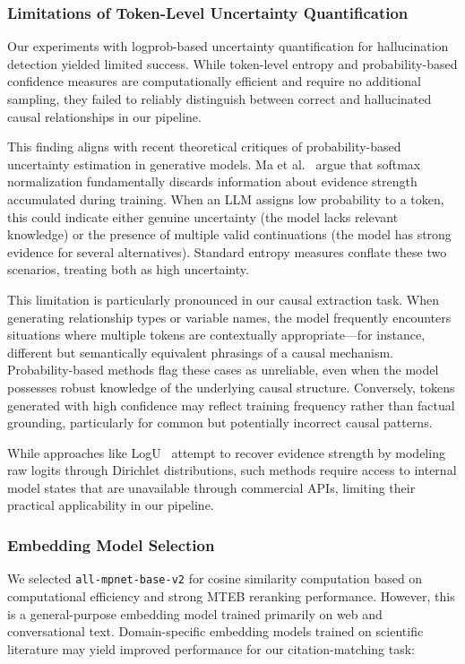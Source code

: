 \subsubsection{Limitations of Token-Level Uncertainty Quantification}

Our experiments with logprob-based uncertainty quantification for hallucination detection yielded limited success. While token-level entropy and probability-based confidence measures are computationally efficient and require no additional sampling, they failed to reliably distinguish between correct and hallucinated causal relationships in our pipeline.

This finding aligns with recent theoretical critiques of probability-based uncertainty estimation in generative models. Ma et al.~\cite{ma2025estimatingllmuncertainty} argue that softmax normalization fundamentally discards information about evidence strength accumulated during training. When an LLM assigns low probability to a token, this could indicate either genuine uncertainty (the model lacks relevant knowledge) or the presence of multiple valid continuations (the model has strong evidence for several alternatives). Standard entropy measures conflate these two scenarios, treating both as high uncertainty.

This limitation is particularly pronounced in our causal extraction task. When generating relationship types or variable names, the model frequently encounters situations where multiple tokens are contextually appropriate---for instance, different but semantically equivalent phrasings of a causal mechanism. Probability-based methods flag these cases as unreliable, even when the model possesses robust knowledge of the underlying causal structure. Conversely, tokens generated with high confidence may reflect training frequency rather than factual grounding, particularly for common but potentially incorrect causal patterns.

While approaches like LogU~\cite{ma2025estimatingllmuncertainty} attempt to recover evidence strength by modeling raw logits through Dirichlet distributions, such methods require access to internal model states that are unavailable through commercial APIs, limiting their practical applicability in our pipeline.

\subsubsection{Embedding Model Selection}

We selected \texttt{all-mpnet-base-v2} for cosine similarity computation based on computational efficiency and strong MTEB reranking performance. However, this is a general-purpose embedding model trained primarily on web and conversational text. Domain-specific embedding models trained on scientific literature may yield improved performance for our citation-matching task:

